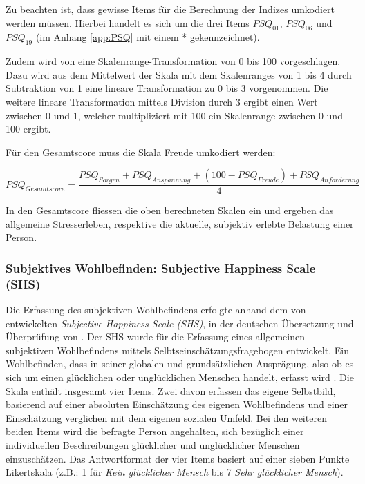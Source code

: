 Zu beachten ist, dass gewisse Items für die Berechnung der Indizes umkodiert werden müssen. Hierbei handelt es sich um die drei Items $PSQ_{01}$, $PSQ_{06}$ und $PSQ_{19}$ (im Anhang \ref{app:PSQ} mit einem * gekennzeichnet).

Zudem wird von  eine Skalenrange-Transformation von 0 bis 100 vorgeschlagen. Dazu wird aus dem Mittelwert der Skala mit dem Skalenranges von 1 bis 4 durch Subtraktion von 1 eine lineare Transformation zu 0 bis 3 vorgenommen. Die weitere lineare Transformation mittels Division durch 3 ergibt einen Wert zwischen 0 und 1, welcher multipliziert mit 100 ein Skalenrange zwischen 0 und 100 ergibt.  

Für den Gesamtscore muss die Skala Freude umkodiert werden:

\begin{equation}\label{eq:PSQGesamtscore}
    PSQ_{Gesamtscore}=\frac{PSQ_{Sorgen}+PSQ_{Anspannung}+ (100-PSQ_{Freude})+PSQ_{Anforderung}}{4}
\end{equation}

In den Gesamtscore fliessen die oben berechneten Skalen ein und ergeben das allgemeine Stresserleben, respektive die aktuelle, subjektiv erlebte Belastung einer Person.

\subsubsection{Subjektives Wohlbefinden: Subjective Happiness Scale (SHS)}\label{sec:SWB}
Die Erfassung des subjektiven Wohlbefindens erfolgte anhand dem von  entwickelten \textit{Subjective Happiness Scale (SHS)}, in der deutschen Übersetzung und Überprüfung von . Der SHS wurde für die Erfassung  eines allgemeinen subjektiven Wohlbefindens mittels Selbtseinschätzungsfragebogen entwickelt. Ein Wohlbefinden, dass in seiner globalen und grundsätzlichen Ausprägung, also ob es sich um einen glücklichen oder unglücklichen Menschen handelt, erfasst wird  \cite[S.~139ff]{Lyubomirsky1999}. Die Skala enthält insgesamt vier Items. Zwei davon erfassen das eigene Selbstbild, basierend auf einer absoluten Einschätzung des eigenen Wohlbefindens und einer Einschätzung verglichen mit dem eigenen sozialen Umfeld. Bei den weiteren beiden Items wird die befragte Person angehalten, sich bezüglich einer individuellen Beschreibungen glücklicher und unglücklicher Menschen einzuschätzen. Das Antwortformat der vier Items basiert auf einer sieben Punkte Likertskala (z.B.: 1 für \textit{Kein glücklicher Mensch} bis 7 \textit{Sehr glücklicher Mensch}). 

